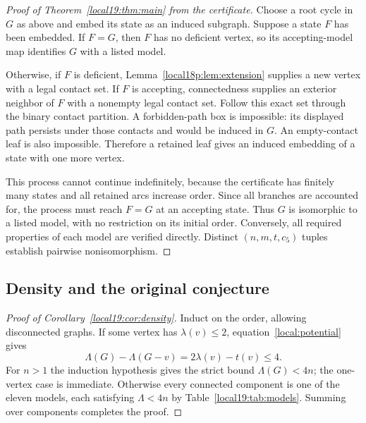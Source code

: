 \documentclass[11pt,a4paper]{article}
\theoremstyle{definition}\newtheorem{definition}[theorem]{Definition}
\theoremstyle{remark}\newtheorem{remark}[theorem]{Remark}
\begin{document}
\begin{proof}[Proof of Theorem~\ref{local19:thm:main} from the certificate]
Choose a root cycle in $G$ as above and embed its state as an induced
subgraph. Suppose a state $F$ has been embedded. If $F=G$, then $F$
has no deficient vertex, so its accepting-model map identifies $G$
with a listed model.

Otherwise, if $F$ is deficient, Lemma~\ref{local18p:lem:extension} supplies a new
vertex with a legal contact set. If $F$ is accepting, connectedness
supplies an exterior neighbor of $F$ with a nonempty legal contact set.
Follow this exact set through the binary contact partition. A
forbidden-path box is impossible: its displayed path persists under
those contacts and would be induced in $G$. An empty-contact leaf is
also impossible. Therefore a retained leaf gives an induced embedding
of a state with one more vertex.

This process cannot continue indefinitely, because the certificate has
finitely many states and all retained arcs increase order. Since all
branches are accounted for, the process must reach $F=G$ at an accepting
state. Thus $G$ is isomorphic to a listed model, with no restriction on
its initial order. Conversely, all required properties of each model
are verified directly. Distinct $(n,m,t,c_5)$ tuples establish pairwise
nonisomorphism.
\end{proof}

\subsection{Density and the original conjecture}
\begin{proof}[Proof of Corollary~\ref{local19:cor:density}]
Induct on the order, allowing disconnected graphs. If some vertex has
$\lambda(v)\le2$, equation~\eqref{local:potential} gives
\[
 \Lambda(G)-\Lambda(G-v)=2\lambda(v)-t(v)\le4.
\]
For $n>1$ the induction hypothesis gives the strict bound $\Lambda(G)<4n$;
the one-vertex case is immediate. Otherwise every connected component
is one of the eleven models, each satisfying $\Lambda<4n$ by
Table~\ref{local19:tab:models}. Summing over components completes the proof.
\end{proof}
\end{document}
